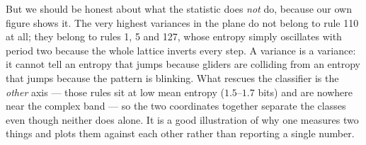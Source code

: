 \documentclass[11pt,a4paper]{article}
\begin{document}
But we should be honest about what the statistic does \emph{not} do, because our
own figure shows it. The very highest variances in the plane do not belong to rule
110 at all; they belong to rules 1, 5 and 127, whose entropy simply oscillates
with period two because the whole lattice inverts every step. A variance is a
variance: it cannot tell an entropy that jumps because gliders are colliding from
an entropy that jumps because the pattern is blinking. What rescues the classifier
is the \emph{other} axis --- those rules sit at low mean entropy
($\num{1.5}$--$\num{1.7}$ bits) and are nowhere near the complex band --- so the
two coordinates together separate the classes even though neither does alone. It
is a good illustration of why one measures two things and plots them against each
other rather than reporting a single number.
\end{document}

